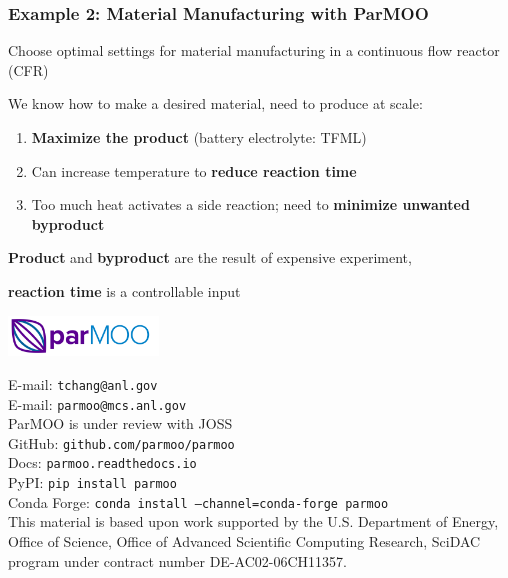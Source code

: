 \documentclass[aspectratio=169]{beamer}
\begin{document}
\begin{frame}\frametitle{Example 2: Material Manufacturing with ParMOO}
Choose optimal settings for material manufacturing in a
continuous flow reactor (CFR)

\bigskip

We know how to make a desired material, need to produce at scale:

\begin{enumerate}
\item {\color{green} \bf Maximize the product} (battery electrolyte: TFML)
\item Can increase temperature to {\bf \color{red} reduce reaction time}
\item Too much heat activates a side reaction; need to
{\bf \color{blue} minimize unwanted byproduct}
\end{enumerate}

\bigskip

{\color{green} \bf Product} and {\color{blue} \bf byproduct} are the result
of expensive experiment,

{\bf \color{red} reaction time} is a controllable input

\end{frame}

\begin{frame}
\begin{center}
\includegraphics[width=0.3\textwidth]{logo-parmoo.png}

\bigskip

{\large
E-mail: {\tt tchang@anl.gov}\\
E-mail: {\tt parmoo@mcs.anl.gov}\\
\bigskip
ParMOO is under review with JOSS\\
\bigskip
GitHub: {\tt github.com/parmoo/parmoo}\\
Docs: {\tt parmoo.readthedocs.io}\\
PyPI: {\tt pip install parmoo}\\
Conda Forge: {\tt conda install --channel=conda-forge parmoo}}\\
\bigskip
{\small This material is based upon work supported by the U.S. Department of Energy, Office of Science, Office of Advanced Scientific Computing Research, SciDAC program under contract number DE-AC02-06CH11357.}
\end{center}
\end{frame}
\end{document}
